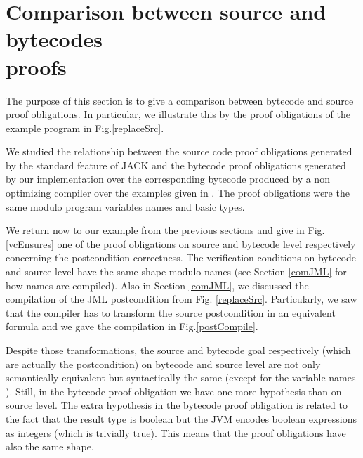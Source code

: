 
\section{Comparison between source and bytecodes \\ proofs}  \label{results}

The purpose of this section is to give a comparison between bytecode and source proof obligations.
In particular, we illustrate this by the proof obligations of the example program in Fig.\ref{replaceSrc}.

We studied the relationship between the source code proof obligations generated 
by the standard feature of JACK and the bytecode proof obligations generated by our implementation over the corresponding bytecode
 produced by a non optimizing compiler over the examples given in \cite{JPVC03JKM}. The proof obligations were the same modulo 
program variables names and basic types.

 We return now to our example from the previous sections and give in Fig.\ref{vcEnsures} one of the proof obligations on source 
and bytecode level respectively concerning the postcondition correctness. The verification conditions on bytecode and source level
 have the same shape modulo names (see Section \ref{comJML} for how names are compiled). Also in Section
 \ref{comJML}, we discussed the compilation of the JML postcondition from Fig. \ref{replaceSrc}. Particularly,
 we saw that the compiler has to transform the source postcondition in an equivalent formula and we
 gave the compilation in Fig.\ref{postCompile}. 

Despite those transformations, the source and bytecode goal respectively (which are actually the postcondition) on bytecode and source level are not only
semantically equivalent but syntactically the same (except for the variable names ). Still, in the bytecode proof obligation we have one more hypothesis than on source level. The extra hypothesis in the bytecode proof obligation is related to the fact that the result type is boolean but the JVM encodes boolean expressions as integers (which is trivially true). This means that the proof obligations have also the same shape.

